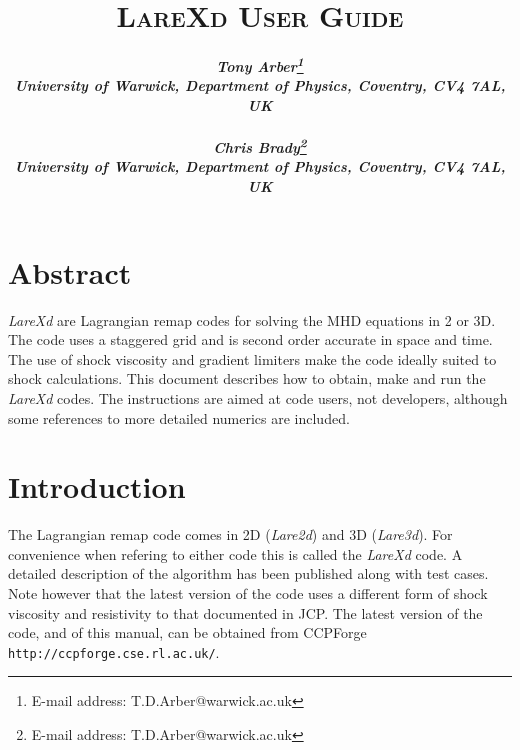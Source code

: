 \documentclass[11pt]{article}
\begin{document}
\title{
\bfseries\scshape LareXd User Guide}
\author{\bfseries\itshape Tony Arber\thanks{E-mail address: T.D.Arber@warwick.ac.uk}\\
University of Warwick, Department of Physics, Coventry, CV4 7AL, UK\\ \\
\bfseries\itshape Chris Brady\thanks{E-mail address: T.D.Arber@warwick.ac.uk}\\
University of Warwick, Department of Physics, Coventry, CV4 7AL, UK}
\date{}
\maketitle

\thispagestyle{empty}

\section*{Abstract}
{\it LareXd} are Lagrangian remap codes for solving the MHD equations in 2 or 3D. The code uses a staggered grid and is second order accurate in space and time. The use of shock viscosity and gradient limiters make the code ideally suited to shock calculations. This document describes how to obtain, make and run the {\it LareXd}  codes. The instructions are aimed at code users, not developers, although some references to more detailed numerics are included.


\section{Introduction}
The Lagrangian remap code comes in 2D ({\it Lare2d}) and 3D ({\it Lare3d}). For convenience when refering to either code this is called the {\it LareXd} code. A detailed description of the algorithm has been published \cite{jcp} along with test cases. Note however that the latest version of the code uses a different form of shock viscosity and resistivity to that documented in JCP. The latest version of the code, and of this manual, can be obtained from CCPForge {\tt http://ccpforge.cse.rl.ac.uk/}. 
\end{document}
